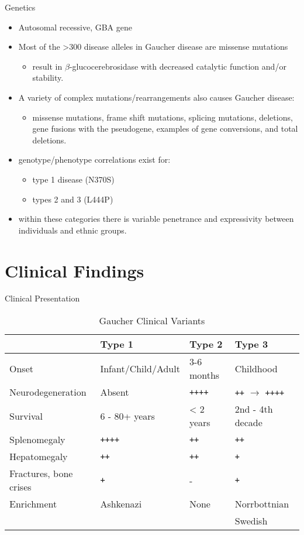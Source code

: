 \documentclass[presentation, smaller]{beamer}
\begin{document}
\begin{frame}[label={sec:orgheadline5}]{Genetics}
\begin{itemize}
\item Autosomal recessive, GBA gene
\item Most of the >300 disease alleles in Gaucher disease are missense
mutations
\begin{itemize}
\item result in \(\beta\)-glucocerebrosidase with decreased catalytic
function and/or stability.
\end{itemize}
\item A variety of complex mutations/rearrangements also causes Gaucher
disease:
\begin{itemize}
\item missense mutations, frame shift mutations, splicing mutations,
deletions, gene fusions with the pseudogene, examples of gene
conversions, and total deletions.
\end{itemize}
\item genotype/phenotype correlations exist for:
\begin{itemize}
\item type 1 disease (N370S)
\item types 2 and 3 (L444P)
\end{itemize}
\item within these categories there is variable penetrance and
expressivity between individuals and ethnic groups.
\end{itemize}
\end{frame}


\section{Clinical Findings}
\label{sec:orgheadline13}
\begin{frame}[fragile,label={sec:orgheadline7}]{Clinical Presentation}
 \begin{table}[htb]
\caption[variants]{\label{tab:variants}
Gaucher Clinical Variants}
\centering
\begin{tabular}{llll}
 & Type 1 & Type 2 & Type 3\\
\hline
Onset & Infant/Child/Adult & 3-6 months & Childhood\\
Neurodegeneration & Absent & \texttt{++++} & \texttt{++} \(\to\) \texttt{++++}\\
Survival & 6 - 80+ years & < 2 years & 2nd - 4th decade\\
Splenomegaly & \texttt{++++} & \texttt{++} & \texttt{++}\\
Hepatomegaly & \texttt{++} & \texttt{++} & \texttt{+}\\
Fractures, bone crises & \texttt{+} & - & \texttt{+}\\
Enrichment & Ashkenazi & None & Norrbottnian\\
 &  &  & Swedish\\
\end{tabular}
\end{table}
\end{frame}
\end{document}
